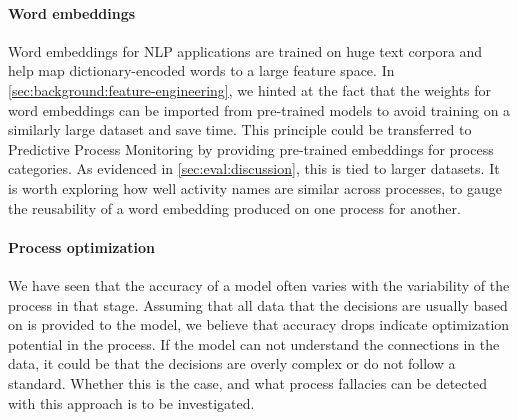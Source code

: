 \paragraph{Word embeddings} Word embeddings for NLP applications are trained on huge text corpora and help map dictionary-encoded words to a large feature space.
In \autoref{sec:background:feature-engineering}, we hinted at the fact that the weights for word embeddings can be imported from pre-trained models to avoid training on a similarly large dataset and save time.
This principle could be transferred to Predictive Process Monitoring by providing pre-trained embeddings for process categories.
As evidenced in \autoref{sec:eval:discussion}, this is tied to larger datasets.
It is worth exploring how well activity names are similar across processes, to gauge the reusability of a word embedding produced on one process for another.

\paragraph{Process optimization} We have seen that the accuracy of a model often varies with the variability of the process in that stage.
Assuming that all data that the decisions are usually based on is provided to the model, we believe that accuracy drops indicate optimization potential in the process.
If the model can not understand the connections in the data, it could be that the decisions are overly complex or do not follow a standard.
Whether this is the case, and what process fallacies can be detected with this approach is to be investigated.
